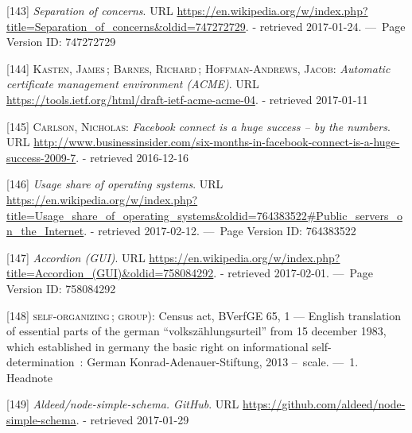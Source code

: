 \documentclass[12pt,english,a4paper,titlepage,cleardoublepage=empty,dottedtoc]{report}
\begin{document}
\hypertarget{ref-web_2016_wikipedia_separation-of-concerns}{}
{[}143{]} \emph{Separation of concerns}. URL
\url{https://en.wikipedia.org/w/index.php?title=Separation_of_concerns\&oldid=747272729}.
- retrieved 2017-01-24. ---~Page Version ID: 747272729

\hypertarget{ref-web_spec_acme}{}
{[}144{]} \textsc{Kasten, James}\,; \textsc{Barnes, Richard}\,;
\textsc{Hoffman-Andrews, Jacob}: \emph{Automatic certificate management
environment (ACME)}. URL
\url{https://tools.ietf.org/html/draft-ietf-acme-acme-04}. - retrieved
2017-01-11

\hypertarget{ref-web_2009-success-of-facebook-connect}{}
{[}145{]} \textsc{Carlson, Nicholas}: \emph{Facebook connect is a huge
success -- by the numbers}. URL
\url{http://www.businessinsider.com/six-months-in-facebook-connect-is-a-huge-success-2009-7}.
- retrieved 2016-12-16

\hypertarget{ref-web_2017_wikipedia_os-market-share}{}
{[}146{]} \emph{Usage share of operating systems}. URL
\url{https://en.wikipedia.org/w/index.php?title=Usage_share_of_operating_systems\&oldid=764383522\#Public_servers_on_the_Internet}.
- retrieved 2017-02-12. ---~Page Version ID: 764383522

\hypertarget{ref-web_2016_wikipedia_accordion-gui}{}
{[}147{]} \emph{Accordion (GUI)}. URL
\url{https://en.wikipedia.org/w/index.php?title=Accordion_(GUI)\&oldid=758084292}.
- retrieved 2017-02-01. ---~Page Version ID: 758084292

\hypertarget{ref-court-decision_1983_census-act-germany}{}
{[}148{]} \textsc{self-organizing}\,; \textsc{group)}: Census act,
BVerfGE 65, 1 --- English translation of essential parts of the german
``volkszählungsurteil'' from 15 december 1983, which established in
germany the basic right on informational self-determination~: German
Konrad-Adenauer-Stiftung, 2013 --~scale. ---~1. Headnote

\hypertarget{ref-web_2017_repo_node-simple-schema}{}
{[}149{]} \emph{Aldeed/node-simple-schema. GitHub}. URL
\url{https://github.com/aldeed/node-simple-schema}. - retrieved
2017-01-29
\end{document}
